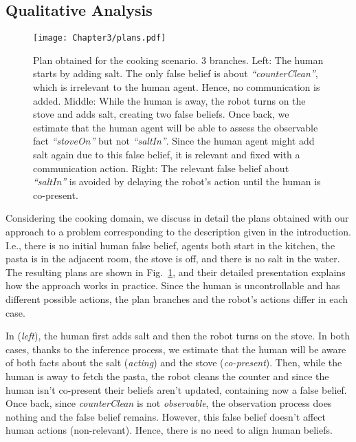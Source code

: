 {\subsection{Qualitative Analysis}

\begin{figure}[t!]
    \centering
    \texttt{[image: Chapter3/plans.pdf]}
    \caption{
    Plan obtained for the cooking scenario. 3 branches. Left: The human starts by adding salt. The only false belief is about \textit{``counterClean''}, which is irrelevant to the human agent. Hence, no communication is added. Middle: While the human is away, the robot turns on the stove and adds salt, creating two false beliefs. 
    Once back, we estimate that the human agent
    will be able to assess the observable fact \textit{``stoveOn''} but not \textit{``saltIn''}. Since the human agent might add salt again due to this false belief, it is relevant and fixed with a communication action. Right: The relevant false belief about \textit{``saltIn''} is avoided by delaying the robot's action until the human is co-present.
    }
    \label{fig:cooking_plan}
\end{figure}

Considering the cooking domain, we discuss in detail the plans obtained with our approach to a problem corresponding to the description given in the introduction. 
I.e., there is no initial human false belief, agents both start in the kitchen, the pasta is in the adjacent room, the stove is off, and there is no salt in the water. The resulting plans are shown in Fig.~\ref{fig:cooking_plan}, and their detailed presentation explains how the approach works in practice. 
Since the human is uncontrollable and has different possible actions, the plan branches and the robot's actions differ in each case. 

In (\textit{left}), the human first adds salt and then the robot turns on the stove. In both cases, thanks to the inference process, we estimate that the human will be aware of both facts about the salt (\textit{acting}) and the stove (\textit{co-present}). Then, while the human is away to fetch the pasta, the robot cleans the counter and since the human isn't co-present their beliefs aren't updated, containing now a false belief. Once back, since \textit{counterClean} is not \textit{observable}, the observation process does nothing and the false belief remains. However, this false belief doesn't affect human actions (non-relevant). Hence, there is no need to align human beliefs.

}
